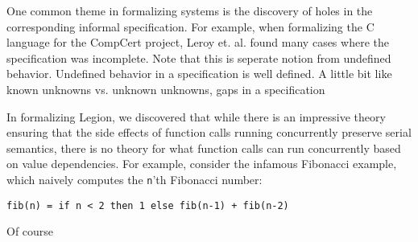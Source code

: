 One common theme in formalizing systems is the discovery of holes in the
corresponding informal specification. For example, when formalizing the C
language for the CompCert project, Leroy et. al. found many cases where the
specification was incomplete. Note that this is seperate notion from undefined
behavior. Undefined behavior in a specification is well defined. A little bit
like known unknowns vs. unknown unknowns, gaps in a specification  

In formalizing Legion, we discovered that while there is an impressive theory
ensuring that the side effects of function calls running concurrently preserve
serial semantics, there is no theory for what function calls can run
concurrently based on value dependencies. For example, consider the infamous
Fibonacci example, which naively computes the \texttt{n}'th Fibonacci number: 

\begin{lstlisting}
fib(n) = if n < 2 then 1 else fib(n-1) + fib(n-2)
\end{lstlisting}
 
Of course 

